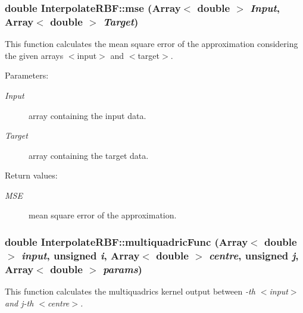 \subsubsection{\setlength{\rightskip}{0pt plus 5cm}double Interpolate\-RBF::mse (Array$<$ double $>$ {\em Input}, Array$<$ double $>$ {\em Target})}\label{classInterpolateRBF_a6}


This function calculates the mean square error of the approximation considering the given arrays $<$input$>$ and $<$target$>$. 

\begin{Desc}
\item[Parameters:]
\begin{description}
\item[{\em Input}]array containing the input data. \item[{\em Target}]array containing the target data. \end{description}
\end{Desc}
\begin{Desc}
\item[Return values:]
\begin{description}
\item[{\em MSE}]mean square error of the approximation.\end{description}
\end{Desc}
\subsubsection{\setlength{\rightskip}{0pt plus 5cm}double Interpolate\-RBF::multiquadric\-Func (Array$<$ double $>$ {\em input}, unsigned {\em i}, Array$<$ double $>$ {\em centre}, unsigned {\em j}, Array$<$ double $>$ {\em params})\hspace{0.3cm}{\tt  [static]}}\label{classInterpolateRBF_e4}


This function calculates the multiquadrics kernel output between {\em -th $<$input$>$ and j-th $<$centre$>$. \/}


